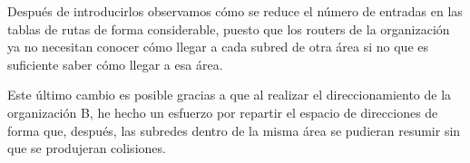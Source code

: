 \par Después de introducirlos observamos cómo se reduce el número de entradas en las tablas de rutas de forma considerable, puesto que los routers de la organización ya no necesitan conocer cómo llegar a cada subred de otra área si no que es suficiente saber cómo llegar a esa área.
\par Este último cambio es posible gracias a que al realizar el direccionamiento de la organización B, he hecho un esfuerzo por repartir el espacio de direcciones de forma que, después, las subredes dentro de la misma área se pudieran resumir sin que se produjeran colisiones.








